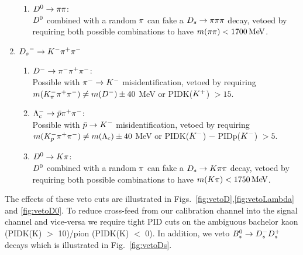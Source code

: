 \begin{enumerate}
\begin{enumerate}
	\item ${{D}^0}\rightarrow{\ensuremath{\pi}}{\ensuremath{\pi}}$: \\
	${{D}^0}$ combined with a random ${\pi}$ can fake a ${{D}_{s}}\rightarrow{\ensuremath{\pi}}{\ensuremath{\pi}}{\ensuremath{\pi}}$ decay, 
		vetoed by requiring both possible combinations to have $m({\pi}{\pi}) < 1700 \mathrm{\,Me\kern -0.1em V}$.
\end{enumerate}

\item ${{D}_{s}}^- \rightarrow K^- {\pi}^+{\pi}^-$

\begin{enumerate}


	\item ${{D}^-} \rightarrow{\ensuremath{{\pi}^-}}{\ensuremath{{\pi}^+}}{\ensuremath{{\pi}^-}}$:  \\
	Possible with ${{\pi}^-}\rightarrow{\ensuremath{{K}^-}}$ misidentification, vetoed by requiring 
	$m(K^-_\pi {\ensuremath{{\pi}^+}} {\ensuremath{{\pi}^-}}) \ne m(D^-) \pm 40$ MeV 
	or PIDK(${{K}^+}$) $> 15$.
	
	
	\item $\Lambda_c^- \rightarrow \bar p {{\pi}^+} {{\pi}^-} $: \\
	Possible with $\bar p \rightarrow {\ensuremath{{K}^-}}$ misidentification, vetoed by requiring
	$m(K^-_p {{\pi}^+} {{\pi}^-}) \ne m(\Lambda_c) \pm 40$ MeV
	or PIDK(${{K}^-}$) $-$ PIDp(${{K}^-}$) $> 5$.
	
	\item ${{D}^0}\rightarrow{\ensuremath{K}}{\ensuremath{\pi}}$: \\
	${{D}^0}$ combined with a random ${\pi}$ can fake a ${{D}_{s}}\rightarrow{\ensuremath{K}}{\ensuremath{\pi}}{\ensuremath{\pi}}$ decay, 
		vetoed by requiring both possible combinations to have $m({K}{\pi}) < 1750 \mathrm{\,Me\kern -0.1em V}$.
\end{enumerate}

\end{enumerate}
The effects of these veto cuts are illustrated in Figs.~\ref{fig:vetoD},\ref{fig:vetoLambda} and \ref{fig:vetoD0}.
To reduce cross-feed from our calibration channel into the signal channel and vice-versa we require tight PID cuts on the ambiguous bachelor kaon (PIDK(K) $>$ 10)/pion (PIDK(K) $<$ 0). 
In addition, we veto ${{B}^0_{s}}\rightarrow{\ensuremath{{D}^-_{s}}}{\ensuremath{{D}^+_{s}}}$ decays which is illustrated in Fig.~\ref{fig:vetoDs}.
 \clearpage
